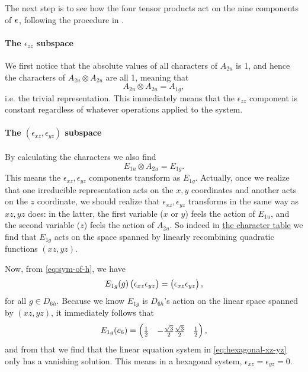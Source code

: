 \documentclass[hyperref, a4paper, 12pt]{article}
\def\\{}%
\begin{document}
The next step is to see how the four tensor products 
act on the nine components of $\vb*{\epsilon}$,
following the procedure in .

\paragraph*{The $\epsilon_{zz}$ subspace}
We first notice that the absolute values of all characters of $A_{2u}$ is 1,
and hence the characters of $A_{2u} \otimes A_{2u}$ are all 1,
meaning that 
\begin{equation}
    A_{2u} \otimes A_{2u} = A_{1g},
\end{equation}
i.e. the trivial representation.
This immediately means that the $\epsilon_{zz}$ component is constant
regardless of whatever operations applied to the system.

\paragraph*{The $(\epsilon_{xz}, \epsilon_{yz})$ subspace}
By calculating the characters we also find 
\begin{equation}
    E_{1u} \otimes A_{2u} = E_{1g}.
\end{equation}
This means the $\epsilon_{xz}, \epsilon_{yz}$ components transform as $E_{1g}$.
Actually, once we realize that one irreducible representation acts on the $x, y$ coordinates
and another acts on the $z$ coordinate,
we should realize that $\epsilon_{xz}, \epsilon_{yz}$
transforms in the same way as $xz, yz$ does:
in the latter, the first variable ($x$ or $y$) feels the action of $E_{1u}$,
and the second variable ($z$) feels the action of $A_{2u}$.
So indeed in \href{http://symmetry.constructor.university/cgi-bin/group.cgi?group=606&option=4}{the character table}
we find that $E_{1g}$ acts on the space spanned by 
linearly recombining quadratic functions $(xz, yz)$.

Now, from \eqref{eq:sym-of-h}, we have 
\begin{equation}
    E_{1g}(g) \pmqty{\epsilon_{xz} \\ \epsilon_{yz}} = \pmqty{\epsilon_{xz} \\ \epsilon_{yz}},
    \label{eq:hexagonal-xz-yz}
\end{equation}
for all $g \in D_{6h}$.
Because we know $E_{1g}$ is $D_{6h}$'s action on the linear space spanned by $(xz, yz)$,
it immediately follows that 
\begin{equation}
    E_{1g}(c_6) = \pmqty{
        \frac{1}{2} & - \frac{\sqrt{3}}{2} \\
        \frac{\sqrt{3}}{2} & \frac{1}{2}
    },
\end{equation}
and from that we find that the linear equation system in \eqref{eq:hexagonal-xz-yz}
only has a vanishing solution.
This means in a hexagonal system, $\epsilon_{xz} = \epsilon_{yz} = 0$.
\end{document}
